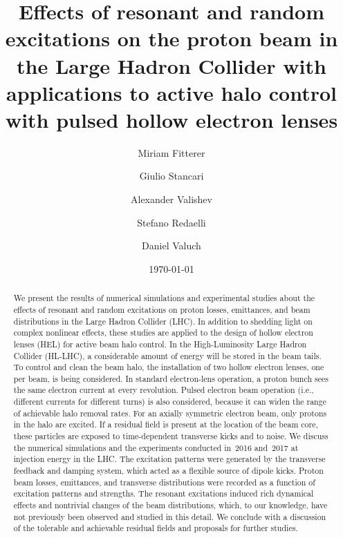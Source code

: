 \documentclass[aps
,prstab
,reprint
,longbibliography
,preprintnumbers
,showkeys
,amsfonts,amssymb,amsmath
,floatfix
]{revtex4-1}
\begin{document}
\title{Effects of resonant and random excitations on the proton beam
  in the Large Hadron Collider with applications to active halo
  control with pulsed hollow electron lenses}

\author{Miriam Fitterer}
\author{Giulio Stancari}
\author{Alexander Valishev}

\author{Stefano Redaelli}
\author{Daniel Valuch}

\date{\today}

\begin{abstract}
  We present the results of numerical simulations and experimental
  studies about the effects of resonant and random excitations on
  proton losses, emittances, and beam distributions in the Large
  Hadron Collider (LHC). In addition to shedding light on complex
  nonlinear effects, these studies are applied to the design of hollow
  electron lenses (HEL) for active beam halo control. In the
  High-Luminosity Large Hadron Collider (HL-LHC), a considerable
  amount of energy will be stored in the beam tails. To control and
  clean the beam halo, the installation of two hollow electron lenses,
  one per beam, is being considered. In standard electron-lens
  operation, a proton bunch sees the same electron current at every
  revolution. Pulsed electron beam operation (i.e., different currents
  for different turns) is also considered, because it can widen the
  range of achievable halo removal rates. For an axially symmetric
  electron beam, only protons in the halo are excited. If a residual
  field is present at the location of the beam core, these particles
  are exposed to time-dependent transverse kicks and to noise. We
  discuss the numerical simulations and the experiments conducted
  in~2016 and~2017 at injection energy in the LHC. The excitation
  patterns were generated by the transverse feedback and damping
  system, which acted as a flexible source of dipole kicks. Proton
  beam losses, emittances, and transverse distributions were recorded
  as a function of excitation patterns and strengths. The resonant
  excitations induced rich dynamical effects and nontrivial changes of
  the beam distributions, which, to our knowledge, have not previously
  been observed and studied in this detail. We conclude with a
  discussion of the tolerable and achievable residual fields and
  proposals for further studies.
\end{abstract}
\end{document}
